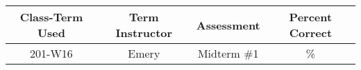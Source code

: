 \begin{outcomes}

\begin{center}
	\begin{tabular}{cccc}
		\hline \hline
		Class-Term Used & Term Instructor & Assessment & Percent Correct\\
		\hline
		201-W16 & Emery & Midterm \#1 & \%\\
		\hline
	\end{tabular}
\end{center}

\end{outcomes}

\begin{comments}

\end{comments}
